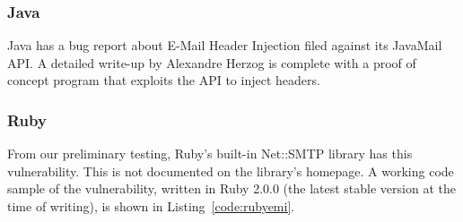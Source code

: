 \subsubsection{Java} 
Java has a bug report about E-Mail Header Injection filed against its JavaMail API. A detailed write-up by Alexandre Herzog \cite{Herzog.2014} is complete with a proof of concept program that exploits the API to inject headers.

\subsubsection{Ruby}
From our preliminary testing, Ruby's built-in Net::SMTP library has this vulnerability. This is not documented on the library's homepage.
A working code sample of the vulnerability, written in Ruby 2.0.0 (the latest stable version at the time of writing), is shown in Listing~\ref{code:rubyemi}.



